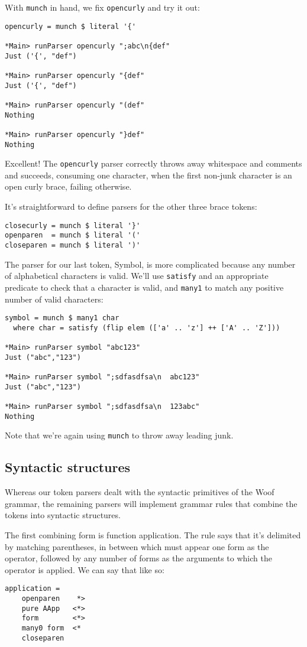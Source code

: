 \documentclass{tmr}
\begin{document}
With \verb+munch+ in hand, we fix \verb+opencurly+ and try it out:
\begin{verbatim}
opencurly = munch $ literal '{'

*Main> runParser opencurly ";abc\n{def"
Just ('{', "def")

*Main> runParser opencurly "{def"
Just ('{', "def")

*Main> runParser opencurly "(def"
Nothing

*Main> runParser opencurly "}def"
Nothing
\end{verbatim}

Excellent!  The \verb+opencurly+ parser correctly throws away whitespace 
and comments and succeeds, consuming one character, when the first non-junk 
character is an open curly brace, failing otherwise.

It's straightforward to define parsers for the other three brace tokens:
\begin{verbatim}
closecurly = munch $ literal '}'
openparen  = munch $ literal '('
closeparen = munch $ literal ')'
\end{verbatim}

The parser for our last token, Symbol, is more complicated because any number of
alphabetical characters is valid.  We'll use \verb+satisfy+ and an appropriate
predicate to check that a character is valid, and \verb+many1+ to 
match any positive number of valid characters:
\begin{verbatim}
symbol = munch $ many1 char
  where char = satisfy (flip elem (['a' .. 'z'] ++ ['A' .. 'Z']))

*Main> runParser symbol "abc123"
Just ("abc","123")

*Main> runParser symbol ";sdfasdfsa\n  abc123"
Just ("abc","123")

*Main> runParser symbol ";sdfasdfsa\n  123abc"
Nothing
\end{verbatim}

Note that we're again using \verb+munch+ to throw away leading junk.

\subsection{Syntactic structures}
Whereas our token parsers dealt with the syntactic primitives of the Woof grammar, 
the remaining parsers will implement grammar rules that combine the tokens
into syntactic structures.

The first combining form is function application.  The rule says that it's delimited
by matching parentheses, in between which must appear one form as the operator, followed
by any number of forms as the arguments to which the operator is applied.  We can
say that like so:
\begin{verbatim}
application =
    openparen    *>
    pure AApp   <*>
    form        <*>
    many0 form  <*
    closeparen
\end{verbatim}
\end{document}
